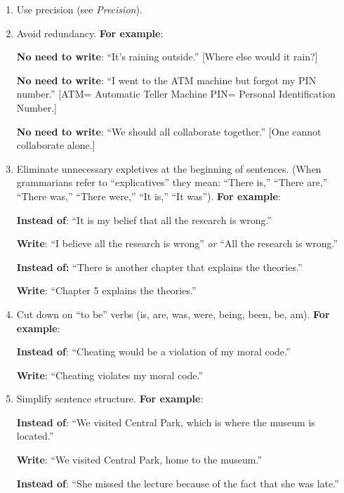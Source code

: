 \begin{enumerate}
 
\item Use precision (see \emph{Precision}).
 
\item Avoid redundancy. \textbf{For example}:
 
\textbf{No need to write}: ``It's raining outside.''
[Where else would it rain?]
 
\textbf{No need to write}: ``I went to the ATM machine but forgot my PIN number.'' 
 [ATM= Automatic Teller Machine PIN= Personal Identification Number.]
 
\textbf{No need to write}: ``We should all collaborate together.'' 
[One cannot collaborate alone.]
 
 \item Eliminate unnecessary expletives at the beginning of sentences. (When grammarians refer to ``explicatives'' they mean: ``There is,'' ``There are,'' ``There was,'' ``There were,'' ``It is,'' ``It was''). \textbf{For example}:
 
  \textbf{Instead of}: ``It is my belief that all the research is wrong.''
 
                  	\textbf{Write}:		``I believe all the research is wrong'' \emph{or} ``All the research is wrong.''
 
 
             	\textbf{Instead of:}    	``There is another chapter that explains the theories.''
 
                    	\textbf{Write}:       	``Chapter 5 explains the theories.''
 
 
\item Cut down on ``to be'' verbs (is, are, was, were, being, been, be, am). \textbf{For example}:
 
      	\textbf{Instead of}:  	``Cheating would be a violation of my moral code.''
 
      	\textbf{Write}:          	``Cheating violates my moral code.''
 
 
\item Simplify sentence structure. \textbf{For example}:
 
    	\textbf{Instead of}: 	``We visited Central Park, which is where the museum is located.''
 
    	\textbf{Write}:          	``We visited Central Park, home to the museum.''
 
    	\textbf{Instead of}: ``She missed the lecture because of the fact that she was late.''
 

\end{enumerate}
